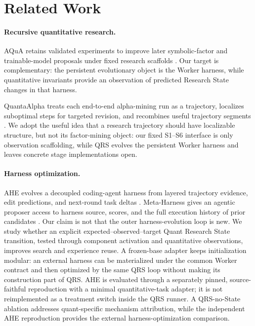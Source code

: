 \section{Related Work}

\paragraph{Recursive quantitative research.}
AQuA retains validated experiments to improve later symbolic-factor and
trainable-model proposals under fixed research scaffolds
\citep{guo2026aqua}. Our target is complementary: the persistent evolutionary
object is the Worker harness, while quantitative invariants provide an
observation of predicted Research State changes in that harness.

QuantaAlpha treats each end-to-end alpha-mining run as a trajectory, localizes
suboptimal steps for targeted revision, and recombines useful trajectory
segments \citep{han2026quantaalpha}. We adopt the useful idea that a research
trajectory should have localizable structure, but not its factor-mining object:
our fixed S1--S6 interface is only observation scaffolding, while QRS evolves
the persistent Worker harness and leaves concrete stage implementations open.

\paragraph{Harness optimization.}
AHE evolves a decoupled coding-agent harness from layered trajectory evidence,
edit predictions, and next-round task deltas \citep{lin2026ahe}.
Meta-Harness gives an agentic proposer access to harness source, scores, and the
full execution history of prior candidates \citep{lee2026metaharness}.
Our claim is not that the outer harness-evolution loop is new. We study whether
an explicit expected--observed--target Quant Research State transition, tested
through component activation and quantitative observations, improves search
and experience reuse. A frozen-base adapter keeps initialization modular: an
external harness can be materialized under the common Worker contract and then
optimized by the same QRS loop without making its construction part of QRS.
AHE is evaluated through a separately pinned,
source-faithful reproduction with a minimal quantitative-task adapter; it is
not reimplemented as a treatment switch inside the QRS runner. A QRS-no-State
ablation addresses quant-specific mechanism attribution, while the independent
AHE reproduction provides the external harness-optimization comparison.

